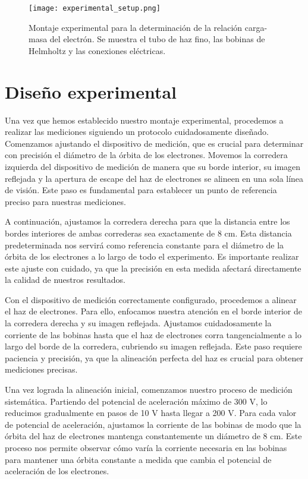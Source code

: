 \documentclass[twocolumn,a4paper,11pt]{scrartcl}
\begin{document}
\begin{figure}[h]
    \centering
    \texttt{[image: experimental\_setup.png]}
    \caption{Montaje experimental para la determinación de la relación carga-masa del electrón. Se muestra el tubo de haz fino, las bobinas de Helmholtz y las conexiones eléctricas.}
    \label{fig:experimental_setup}
\end{figure}

\section{Diseño experimental}

Una vez que hemos establecido nuestro montaje experimental, procedemos a realizar las mediciones siguiendo un protocolo cuidadosamente diseñado. Comenzamos ajustando el dispositivo de medición, que es crucial para determinar con precisión el diámetro de la órbita de los electrones. Movemos la corredera izquierda del dispositivo de medición de manera que su borde interior, su imagen reflejada y la apertura de escape del haz de electrones se alineen en una sola línea de visión. Este paso es fundamental para establecer un punto de referencia preciso para nuestras mediciones.

A continuación, ajustamos la corredera derecha para que la distancia entre los bordes interiores de ambas correderas sea exactamente de 8 cm. Esta distancia predeterminada nos servirá como referencia constante para el diámetro de la órbita de los electrones a lo largo de todo el experimento. Es importante realizar este ajuste con cuidado, ya que la precisión en esta medida afectará directamente la calidad de nuestros resultados.

Con el dispositivo de medición correctamente configurado, procedemos a alinear el haz de electrones. Para ello, enfocamos nuestra atención en el borde interior de la corredera derecha y su imagen reflejada. Ajustamos cuidadosamente la corriente de las bobinas hasta que el haz de electrones corra tangencialmente a lo largo del borde de la corredera, cubriendo su imagen reflejada. Este paso requiere paciencia y precisión, ya que la alineación perfecta del haz es crucial para obtener mediciones precisas.

Una vez lograda la alineación inicial, comenzamos nuestro proceso de medición sistemática. Partiendo del potencial de aceleración máximo de 300 V, lo reducimos gradualmente en pasos de 10 V hasta llegar a 200 V. Para cada valor de potencial de aceleración, ajustamos la corriente de las bobinas de modo que la órbita del haz de electrones mantenga constantemente un diámetro de 8 cm. Este proceso nos permite observar cómo varía la corriente necesaria en las bobinas para mantener una órbita constante a medida que cambia el potencial de aceleración de los electrones.
\end{document}
